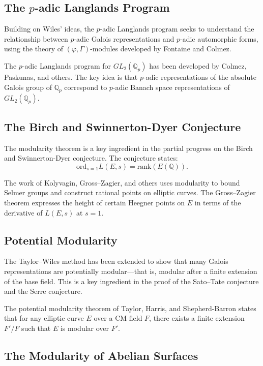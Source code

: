 \subsection{The \texorpdfstring{$p$}{p}-adic Langlands Program}

Building on Wiles' ideas, the $p$-adic Langlands program seeks to understand the relationship between $p$-adic Galois representations and $p$-adic automorphic forms, using the theory of $(\varphi,\Gamma)$-modules developed by Fontaine and Colmez.

The $p$-adic Langlands program for $GL_2(\mathbb{Q}_p)$ has been developed by Colmez, Paskunas, and others. The key idea is that $p$-adic representations of the absolute Galois group of $\mathbb{Q}_p$ correspond to $p$-adic Banach space representations of $GL_2(\mathbb{Q}_p)$.

\subsection{The Birch and Swinnerton-Dyer Conjecture}

The modularity theorem is a key ingredient in the partial progress on the Birch and Swinnerton-Dyer conjecture. The conjecture states:
\[
\mathrm{ord}_{s=1} L(E, s) = \mathrm{rank}(E(\mathbb{Q})).
\]

The work of Kolyvagin, Gross--Zagier, and others uses modularity to bound Selmer groups and construct rational points on elliptic curves. The Gross--Zagier theorem expresses the height of certain Heegner points on $E$ in terms of the derivative of $L(E, s)$ at $s=1$.

\subsection{Potential Modularity}

The Taylor--Wiles method has been extended to show that many Galois representations are potentially modular---that is, modular after a finite extension of the base field. This is a key ingredient in the proof of the Sato--Tate conjecture and the Serre conjecture.

The potential modularity theorem of Taylor, Harris, and Shepherd-Barron states that for any elliptic curve $E$ over a CM field $F$, there exists a finite extension $F'/F$ such that $E$ is modular over $F'$.

\subsection{The Modularity of Abelian Surfaces}

